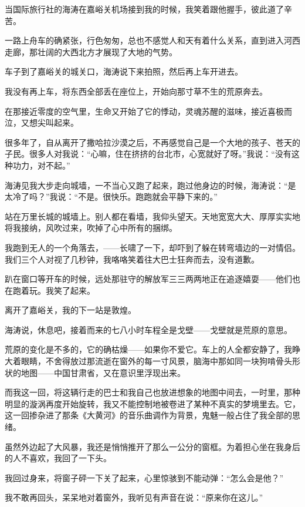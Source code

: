 \par 当国际旅行社的海涛在嘉峪关机场接到我的时候，我笑着跟他握手，彼此道了辛苦。
\par 一路上舟车的确紧张，行色匆匆，总也不感觉人和天有着什么关系，直到进入河西走廊，那壮阔的大西北方才展现了大地的气势。
\par 车子到了嘉峪关的城关口，海涛说下来拍照，然后再上车开进去。
\par 我没有再上车，将东西全部丢在座位上，开始向那寸草不生的荒原奔去。
\par 在那接近零度的空气里，生命又开始了它的悸动，灵魂苏醒的滋味，接近喜极而泣，又想尖叫起来。
\par 很多年了，自从离开了撒哈拉沙漠之后，不再感觉自己是一个大地的孩子、苍天的子民。很多人对我说：“心嘛，住在挤挤的台北市，心宽就好了呀。”我说：“没有这种功力，对不起。”
\par 海涛见我大步走向城墙，一不当心又跑了起来，跑过他身边的时候，海涛说：“是太冷了吗？”我说：“不是。很快乐。跑跑就会平静下来的。”
\par 站在万里长城的城墙上。别人都在看墙，我仰头望天。天地宽宽大大、厚厚实实地将我接纳，风吹过来，吹掉了心中所有的捆绑。
\par 我跑到无人的一个角落去，——长啸了一下，却吓到了躲在转弯墙边的一对情侣。我们三个人对视了几秒钟，我咯咯笑着往大巴士狂奔而去，没有道歉。
\par 趴在窗口等开车的时候，远处那驻守的解放军三三两两地正在追逐嬉耍——他们也在跑着玩。我笑了起来。
\par 
\par 离开了嘉峪关，我的下一站是敦煌。
\par 海涛说，休息吧，接着而来的七八小时车程全是戈壁——戈壁就是荒原的意思。
\par 荒原的变化是不多的，它的确枯燥——如果你不爱它。车上的人全都安静了，我睁大着眼睛，不舍得放过那流逝在窗外的每一寸风景，脑海中那如同一块狗啃骨头形状的地图——中国甘肃省，又在意识里浮现出来。
\par 而我这一回，将这辆行走的巴士和我自己也放进想象的地图中间去，一时里，那种明显的漩涡再度开始旋转，我又不能控制地被卷进了某种不真实的梦境里去。它，这一回掺杂进了那条《大黄河》的音乐曲调作为背景，鬼魅一般占住了我全部的思绪。
\par 虽然外边起了大风暴，我还是悄悄推开了那么一公分的窗框。为着担心坐在我身后的人不喜欢，我回了一下头。
\par 我回过身来，将窗子砰一下关了起来，心里惊骇到不能动弹：“怎么会是他？”
\par 我不敢再回头，呆呆地对着窗外，我听见有声音在说：“原来你在这儿。”
